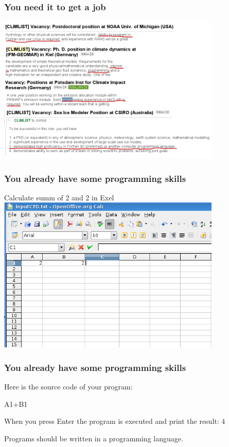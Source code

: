 \documentclass{beamer}
\newcommand{\blankline}{\quad\pagebreak[2]}
\begin{document}
\begin{frame}[fragile]
\frametitle{You need it to get a job}
\begin{center}
\includegraphics[width=0.8\textwidth,angle=00]{job.png}\end{center}
\end{frame}



\begin{frame}[fragile]
\frametitle{You already have some programming skills}
\begin{center}
Calculate summ of 2 and 2 in Exel
\includegraphics[width=0.8\textwidth,angle=00]{2x2.png}\end{center}
\end{frame}
\begin{frame}[fragile]
  \frametitle{You already have some programming skills}
    \begin{block}{Here is the source code of your program:}

      A1+B1

    \end{block}
\blankline
    \begin{block}{When you press Enter the program is executed and print the result:}
      4
    \end{block}
\blankline
\blankline
\pause
Programs should be written in a programming language.

\end{frame}
\end{document}
